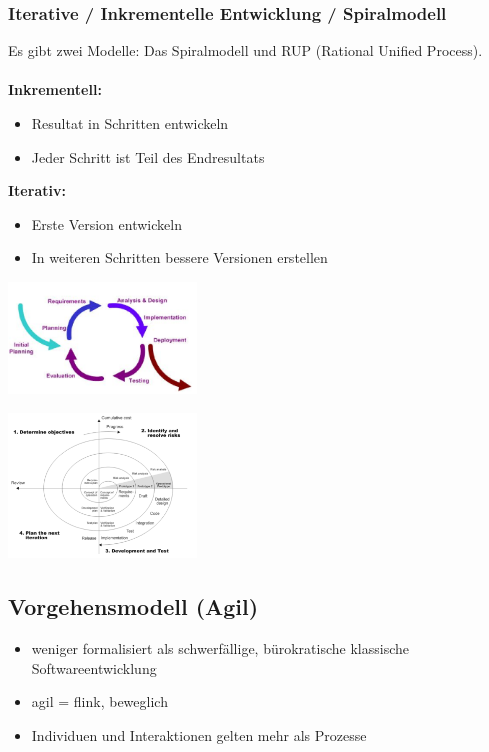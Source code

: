 \subsubsection{Iterative / Inkrementelle Entwicklung / Spiralmodell}
\begin{minipage}{8cm}
Es gibt zwei Modelle: Das Spiralmodell und RUP (Rational Unified Process).\\
\\
	\textbf{Inkrementell:}
		\begin{itemize}
			\item Resultat in Schritten entwickeln
			\item Jeder Schritt ist Teil des Endresultats
		\end{itemize}
	\textbf{Iterativ:}
		\begin{itemize}					
			\item Erste Version entwickeln
			\item In weiteren Schritten bessere Versionen erstellen
		\end{itemize}
\end{minipage}
\begin{minipage}{6cm} %
	\includegraphics[width=5cm]{images/iterative_entwicklung.png}
\end{minipage}
\begin{minipage}{8cm}
	\includegraphics[width=5cm]{images/spiral_modell.png}
\end{minipage}


\subsection{Vorgehensmodell (Agil)}
\begin{itemize}
	\item weniger formalisiert als schwerfällige, bürokratische klassische Softwareentwicklung
	\item agil = flink, beweglich
	\item Individuen und Interaktionen gelten mehr als Prozesse
\end{itemize}

